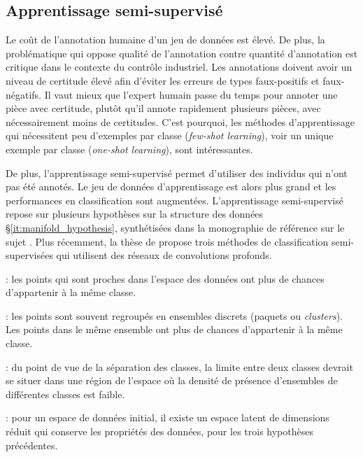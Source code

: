 \bigskip

\bigskip

\subsection{Apprentissage semi-supervisé} \label{subsec:semi_supervised}
Le coût de l'annotation humaine d'un jeu de données est élevé.
De plus, la problématique qui oppose qualité de l'annotation contre quantité d'annotation est critique dans le contexte du contrôle industriel.
Les annotations doivent avoir un niveau de certitude élevé afin d'éviter les erreurs de types faux-positifs et faux-négatifs.
Il vaut mieux que l'expert humain passe du temps pour annoter une pièce avec certitude, plutôt qu'il annote rapidement plusieurs pièces, avec nécessairement moins de certitudes.
C'est pourquoi, les méthodes d'apprentissage qui nécessitent peu d'exemples par classe (\textit{few-shot learning}), voir un unique exemple par classe (\textit{one-shot learning}), sont intéressantes.

De plus, l'apprentissage semi-supervisé permet d'utiliser des individus qui n'ont pas été annotés.
Le jeu de données d'apprentissage est alors plus grand et les performances en classification sont augmentées.
L'apprentissage semi-supervisé repose sur plusieurs hypothèses sur la structure des données §\ref{it:manifold_hypothesis}, synthétisées dans la monographie de référence sur le sujet  \cite{chapelle_semi-supervised_2010}.
Plus récemment, la thèse de \citeauthor{durand_weakly_2017} \cite{durand_weakly_2017} propose trois méthodes de classification semi-supervisées qui utilisent des réseaux de convolutions profonds.

\newpage
\begin{description} \label{it:manifold_hypothesis}
	\item[Hypothèse de continuité] : les points qui sont proches dans l'espace des données ont plus de chances d'appartenir à la même classe.
	\item[Hypothèse d'ensembles] : les points sont souvent regroupés en ensembles discrets (paquets ou \textit{clusters}). Les points dans le même ensemble ont plus de chances d'appartenir à la même classe.
	\item[Hypothèse de densité faible] : du point de vue de la séparation des classes, la limite entre deux classes devrait se situer dans une région de l'espace où la densité de présence d'ensembles de différentes classes est faible.
	\item[Hypothèse de variétés] : pour un espace de données initial, il existe un espace latent de dimensions réduit qui conserve les propriétés des données, pour les trois hypothèses précédentes.
\end{description}

